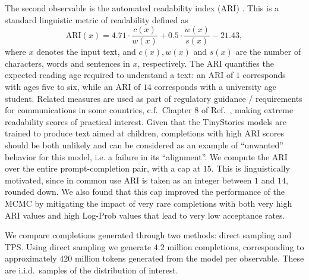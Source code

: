 \documentclass{article}
\begin{document}
The second observable is the automated readability index (ARI) \cite{kincaid1975derivation}. This is a standard linguistic metric of readability defined as
\begin{equation}
    \text{ARI}(x) = 4.71 \cdot \frac{c(x)}{w(x)} + 0.5 \cdot \frac{w(x)}{s(x)} - 21.43,
\end{equation}
where $x$ denotes the input text, and $c(x), w(x)$ and $s(x)$ are the number of characters, words and sentences in $x$, respectively. The ARI quantifies the expected reading age required to understand a text: an ARI of $1$ corresponds with ages five to six, while an ARI of $14$ corresponds with a university age student. Related measures are used as part of
regulatory guidance / requirements for communications in some countries, c.f.\ Chapter 8 of Ref.~\cite{fca2022fg22/5:}, making extreme readability scores of practical interest. Given that the TinyStories models are trained to produce text aimed at children, completions with high ARI scores should be both unlikely and can be considered as an example of ``unwanted'' behavior for this model, i.e. a failure in its ``alignment''. We compute the ARI over the entire prompt-completion pair, with a cap at $15$. This is linguistically motivated, since in common use ARI is taken as an integer between $1$ and $14$, rounded down. We also found that this cap improved the performance of the MCMC by mitigating the impact of very rare completions with both very high ARI values and high Log-Prob values that lead to very low acceptance rates.

We compare completions generated through two methods: direct sampling and TPS. Using direct sampling we generate $4.2$ million completions, corresponding to approximately $420$ million tokens generated from the model per observable. These are i.i.d.\ samples of the distribution of interest.
\end{document}
